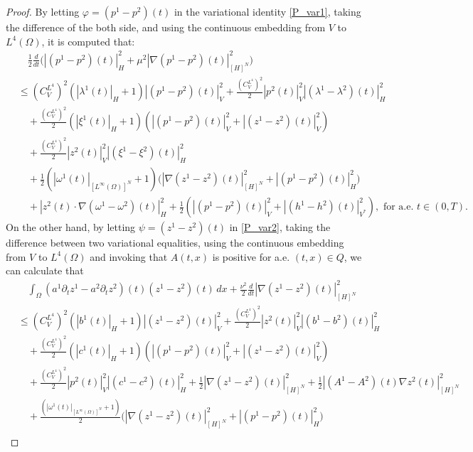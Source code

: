 \documentclass{sinst}
\numberwithin{equation}{section}
\theoremstyle{plain}
\theoremstyle{definition}
\begin{document}
\begin{proof}
  By letting $\varphi = (p^1 - p^2)(t)$ in the variational identity \eqref{P_var1}, taking the difference of the both side, and using the continuous embedding from $V$ to $L^4(\Omega)$, it is computed that:
  \begin{align}
    &\quad \frac{1}{2}\frac{d}{dt}\bigl( |(p^1 - p^2)(t)|_H^2 + \mu^2 |\nabla (p^1 - p^2)(t)|_{[H]^N}^2 \bigr) \label{P_uni_1}
    \\
    &\leq (C_V^{L^4})^2 (|\lambda^1(t)|_H + 1) |(p^1 - p^2)(t)|_V^2 + \frac{(C_V^{L^4})^2}{2}|p^2(t)|_V^2 |(\lambda^1 - \lambda^2)(t)|_H^2 
    \\
    &\quad + \frac{(C_V^{L^4})^2}{2}(|\xi^1(t)|_H + 1) (|(p^1 - p^2)(t)|_V^2 + |(z^1 - z^2)(t)|_V^2) 
    \\
    &\quad + \frac{(C_V^{L^4})^2}{2}|z^2(t)|_V^2 |(\xi^1 - \xi^2)(t)|_H^2 
    \\
    &\quad + \frac{1}{2}(|\omega^1(t)|_{[L^\infty(\Omega)]^N} + 1) \bigl( |\nabla (z^1 - z^2)(t)|_{[H]^N}^2 + |(p^1 - p^2)(t)|_H^2 \bigr)
    \\
    &\quad + |z^2(t) \cdot \nabla (\omega^1 - \omega^2)(t)|_H^2+ \frac{1}{2}(|(p^1 - p^2)(t)|_V^2 + |(h^1 - h^2)(t)|_{V^*}^2), \mbox{ for a.e. } t \in (0,T).
  \end{align}
  On the other hand, by letting $\psi = (z^1 - z^2)(t)$ in \eqref{P_var2}, taking the difference between two variational equalities, using the continuous embedding from $V$ to $L^4(\Omega)$ and invoking that $A(t,x)$ is positive for a.e. $(t,x) \in Q$, we can calculate that
  \begin{align}
    &\quad \int_\Omega (a^1 \partial_t z^1 - a^2 \partial_t z^2)(t) (z^1 - z^2)(t)\,dx + \frac{\nu^2}{2} \frac{d}{dt} |\nabla (z^1 - z^2)(t)|_{[H]^N}^2 \label{P_uni_2}
    \\
    &\leq (C_V^{L^4})^2(|b^1(t)|_H + 1) |(z^1 - z^2)(t)|_V^2 + \frac{(C_V^{L^4})^2}{2}|z^2(t)|_V^2 |(b^1 - b^2)(t)|_H^2 
    \\
    &\quad + \frac{(C_V^{L^4})^2}{2}(|c^1(t)|_H + 1) (|(p^1 - p^2)(t)|_V^2 + |(z^1 - z^2)(t)|_V^2)
    \\
    &\quad + \frac{(C_V^{L^4})^2}{2}|p^2(t)|_V^2 |(c^1 - c^2)(t)|_H^2 + \frac{1}{2}|\nabla (z^1 - z^2)(t)|_{[H]^N}^2 + \frac{1}{2}|(A^1 - A^2)(t) \nabla z^2(t)|_{[H]^N}^2
    \\
    &\quad + \frac{(|\omega^1(t)|_{[L^\infty(\Omega)]^N} + 1)}{2} \bigl( |\nabla (z^1 - z^2)(t)|_{[H]^N}^2 + |(p^1 - p^2)(t)|_H^2 \bigr)
    \\

\end{align}
\end{proof}
\end{document}
